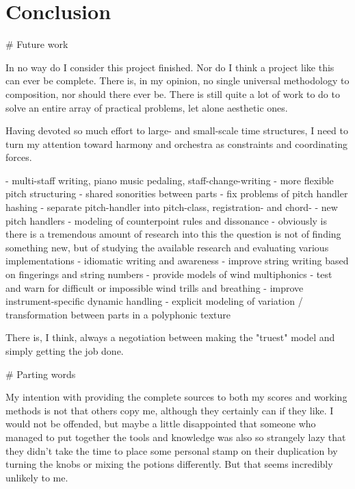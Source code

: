 \chapter{Conclusion}
\label{chap:conclusion}

\begin{markdown}

# Future work

In no way do I consider this project finished. Nor do I think a project like
this can ever be complete. There is, in my opinion, no single universal
methodology to composition, nor should there ever be. There is still quite a
lot of work to do to solve an entire array of practical problems, let alone
aesthetic ones.



Having devoted so much effort to large- and small-scale time structures, I need
to turn my attention toward harmony and orchestra as constraints and
coordinating forces.

-   multi-staff writing, piano music pedaling, staff-change-writing
-   more flexible pitch structuring
    -   shared sonorities between parts
    -   fix problems of pitch handler hashing
    -   separate pitch-handler into pitch-class, registration- and chord-
    -   new pitch handlers
    -   modeling of counterpoint rules and dissonance
        - obviously is there is a tremendous amount of research into this
          the question is not of finding something new, but of studying the 
          available research and evaluating various implementations
-   idiomatic writing and awareness
    -   improve string writing based on fingerings and string numbers
    -   provide models of wind multiphonics
    -   test and warn for difficult or impossible wind trills and breathing
    -   improve instrument-specific dynamic handling
-   explicit modeling of variation / transformation between parts in a
    polyphonic texture

There is, I think, always a negotiation between making the "truest" model and
simply getting the job done.

# Parting words

My intention with providing the complete sources to both my scores and working
methods is not that others copy me, although they certainly can if they like. I
would not be offended, but maybe a little disappointed that someone who managed
to put together the tools and knowledge was also so strangely lazy that they
didn't take the time to place some personal stamp on their duplication by
turning the knobs or mixing the potions differently. But that seems incredibly
unlikely to me.


\end{markdown}
